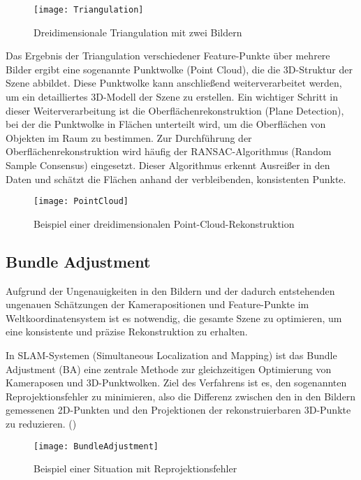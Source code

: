 \begin{figure}
    \centering
    \texttt{[image: Triangulation]}
    \caption{Dreidimensionale Triangulation mit zwei Bildern\label{fig:Triangulation}}\par
\end{figure}

Das Ergebnis der Triangulation verschiedener Feature-Punkte über mehrere Bilder ergibt eine sogenannte Punktwolke (Point Cloud), die die 3D-Struktur der Szene abbildet. Diese Punktwolke kann anschließend weiterverarbeitet werden, um ein detailliertes 3D-Modell der Szene zu erstellen. Ein wichtiger Schritt in dieser Weiterverarbeitung ist die Oberflächenrekonstruktion (Plane Detection), bei der die Punktwolke in Flächen unterteilt wird, um die Oberflächen von Objekten im Raum zu bestimmen. Zur Durchführung der Oberflächenrekonstruktion wird häufig der RANSAC-Algorithmus (Random Sample Consensus) eingesetzt. Dieser Algorithmus erkennt Ausreißer in den Daten und schätzt die Flächen anhand der verbleibenden, konsistenten Punkte.

\begin{figure}
    \centering
    \texttt{[image: PointCloud]}
    \caption{Beispiel einer dreidimensionalen Point-Cloud-Rekonstruktion\label{fig:PointCloud}}\par
\end{figure}

\subsection{Bundle Adjustment}

Aufgrund der Ungenauigkeiten in den Bildern und der dadurch entstehenden ungenauen Schätzungen der Kamerapositionen und Feature-Punkte im Weltkoordinatensystem ist es notwendig, die gesamte Szene zu optimieren, um eine konsistente und präzise Rekonstruktion zu erhalten. 

In SLAM-Systemen (Simultaneous Localization and Mapping) ist das Bundle Adjustment (BA) eine zentrale Methode zur gleichzeitigen Optimierung von Kameraposen und 3D-Punktwolken. Ziel des Verfahrens ist es, den sogenannten Reprojektionsfehler zu minimieren, also die Differenz zwischen den in den Bildern gemessenen 2D-Punkten und den Projektionen der rekonstruierbaren 3D-Punkte zu reduzieren. (\cite{gao2021vSLAM})

\begin{figure}
    \centering
    \texttt{[image: BundleAdjustment]}
    \caption{Beispiel einer Situation mit Reprojektionsfehler\label{fig:BA}}\par
\end{figure}


